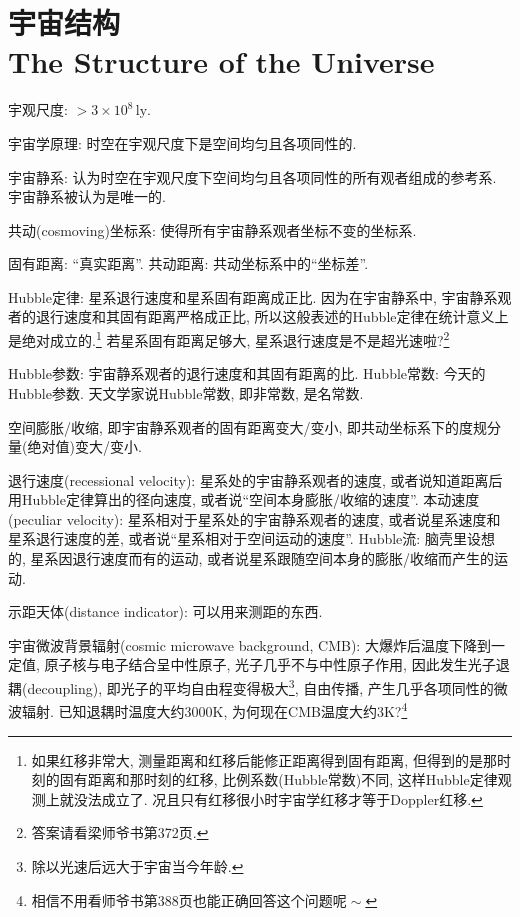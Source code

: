 \chapter{宇宙结构\\The Structure of the Universe}

宇观尺度: $>3\times10^{8}\,\text{ly}$.

宇宙学原理: 时空在宇观尺度下是空间均匀且各项同性的.

宇宙静系: 认为时空在宇观尺度下空间均匀且各项同性的所有观者组成的参考系. 宇宙静系被认为是唯一的.

共动(cosmoving)坐标系: 使得所有宇宙静系观者坐标不变的坐标系.

固有距离: ``真实距离''. 共动距离: 共动坐标系中的``坐标差''.

Hubble定律: 星系退行速度和星系固有距离成正比. 因为在宇宙静系中, 宇宙静系观者的退行速度和其固有距离严格成正比, 所以这般表述的Hubble定律在统计意义上是绝对成立的.\footnote{如果红移非常大, 测量距离和红移后能修正距离得到固有距离, 但得到的是那时刻的固有距离和那时刻的红移, 比例系数(Hubble常数)不同, 这样Hubble定律观测上就没法成立了. 况且只有红移很小时宇宙学红移才等于Doppler红移.} 若星系固有距离足够大, 星系退行速度是不是超光速啦?\footnote{答案请看梁师爷书第372页.}

Hubble参数: 宇宙静系观者的退行速度和其固有距离的比. Hubble常数: 今天的Hubble参数. 天文学家说Hubble常数, 即非常数, 是名常数.

空间膨胀/收缩, 即宇宙静系观者的固有距离变大/变小, 即共动坐标系下的度规分量(绝对值)变大/变小.

退行速度(recessional velocity): 星系处的宇宙静系观者的速度, 或者说知道距离后用Hubble定律算出的径向速度, 或者说``空间本身膨胀/收缩的速度''. 本动速度(peculiar velocity): 星系相对于星系处的宇宙静系观者的速度, 或者说星系速度和星系退行速度的差, 或者说``星系相对于空间运动的速度''. Hubble流: 脑壳里设想的, 星系因退行速度而有的运动, 或者说星系跟随空间本身的膨胀/收缩而产生的运动.

示距天体(distance indicator): 可以用来测距的东西.

宇宙微波背景辐射(cosmic microwave background, CMB): 大爆炸后温度下降到一定值, 原子核与电子结合呈中性原子, 光子几乎不与中性原子作用, 因此发生光子退耦(decoupling), 即光子的平均自由程变得极大\footnote{除以光速后远大于宇宙当今年龄.}, 自由传播, 产生几乎各项同性的微波辐射. 已知退耦时温度大约$3000\text{K}$, 为何现在CMB温度大约$3\text{K}$?\footnote{相信不用看师爷书第388页也能正确回答这个问题呢$\!\sim$}

